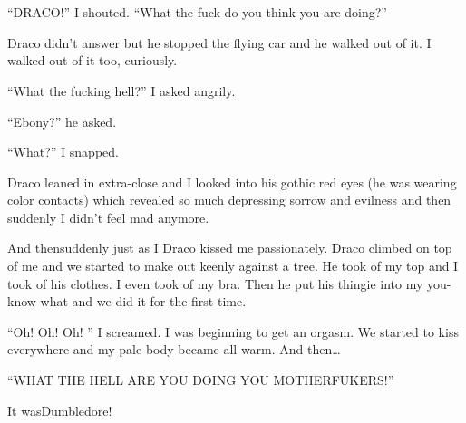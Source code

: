 \section{\chaptername~\thesection}



\enquote{DRACO!} I shouted. \enquote{What the fuck do you think you are doing?}

Draco didn't answer but he stopped the flying car and he walked out of it. I walked out of it too, curiously.

\enquote{What the fucking hell?} I asked angrily.

\enquote{Ebony?} he asked.

\enquote{What?} I snapped.

Draco leaned in extra-close and I looked into his gothic red eyes (he was wearing color contacts) which revealed so much depressing sorrow and evilness and then suddenly I didn't feel mad anymore.

And then\dotfill suddenly just as I Draco kissed me passionately. Draco climbed on top of me and we started to make out keenly against a tree. He took of my top and I took of his clothes. I even took of my bra. Then he put his thingie into my you-know-what and we did it for the first time.

\enquote{Oh! Oh! Oh! } I screamed. I was beginning to get an orgasm. We started to kiss everywhere and my pale body became all warm. And then\ldots

\enquote{WHAT THE HELL ARE YOU DOING YOU MOTHERFUKERS!}

It was\dotfill Dumbledore!
